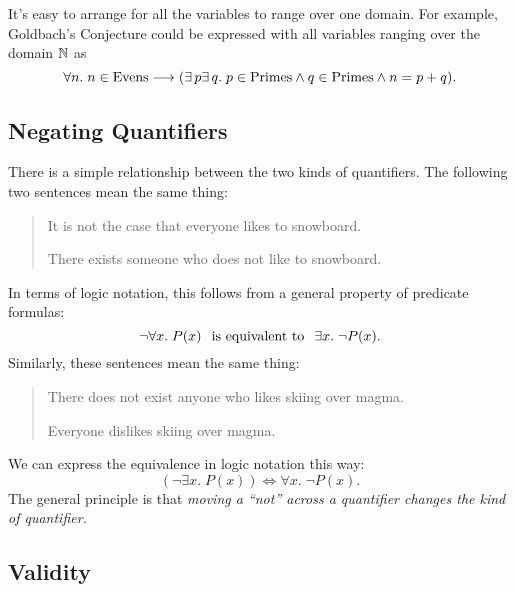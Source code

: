 It's easy to arrange for all the variables to range over one domain.  For
example, Goldbach's Conjecture could be expressed with all variables
ranging over the domain $\mathbb{N}$ as
\[
\forall n.\; n \in \text{Evens} \longrightarrow (\exists\, p \exists\, q.\; p \in \text{Primes} \land
q \in \text{Primes} \land n = p + q).
\]

\subsection{Negating Quantifiers}

There is a simple relationship between the two kinds of quantifiers.  The
following two sentences mean the same thing:
%
\begin{quote}

It is not the case that everyone likes to snowboard.

There exists someone who does not like to snowboard.

\end{quote}
%
In terms of logic notation, this follows from a general property of
predicate formulas:
%
\[
\neg \forall x.\; P(x)
\hspace{0.1in} \text{is equivalent to} \hspace{0.1in}
\exists x.\; \neg P(x).
\]
%
Similarly, these sentences mean the same thing:
%
\begin{quote}
There does not exist anyone who likes skiing over magma.

Everyone dislikes skiing over magma.
\end{quote}
%
We can express the equivalence in logic notation this way:
%
\begin{equation}\label{nE}
(\neg \exists x.\; P(x))  \iff \forall x.\; \neg P(x).
\end{equation}
%
The general principle is that \textit{moving a ``not'' across a
quantifier changes the kind of quantifier.}

\iffalse Logicians have worked very hard to define strict rules for the
use of logic notation so that ideas can be expressed with absolute rigor.
It's all quite charming and clever.  However, the sad irony is that
applied mathematicans usually use their beloved notation as a crude
shorthand, breaking the rules and abusing the notation willy-nilly ---sort
of like pounding nails with fine china.  \fi

\subsection{Validity}

